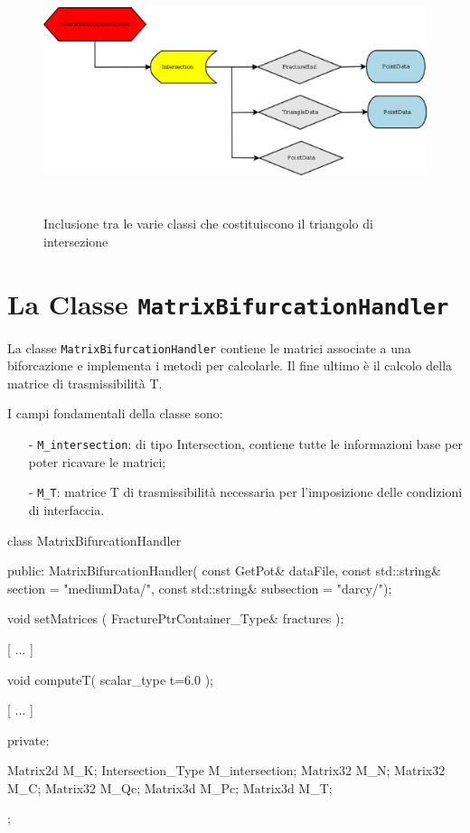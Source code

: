 \newpage
\begin{figure}[htbp]
\centering
\includegraphics[height=7cm, width=1\textwidth]{img/MatrixBifurcationHandler2.eps}
\caption{Inclusione tra le varie classi che costituiscono il triangolo di intersezione}\label{Inclusione classi MatrixBifurcationHandler}
\end{figure}

\section{La Classe \texttt{MatrixBifurcationHandler}}
La classe \texttt{MatrixBifurcationHandler} contiene le matrici associate a una biforcazione e implementa i metodi per calcolarle.  Il fine ultimo è il calcolo della matrice di trasmissibilità T.

\noindent I campi fondamentali della classe sono:
	\begin{enumerate}
	\item[-] \texttt{M\_intersection}: di tipo Intersection, contiene tutte le informazioni base per poter ricavare le matrici;
	\item[-] \texttt{M\_T}: matrice T di trasmissibilità necessaria per l'imposizione delle condizioni di interfaccia.
	\end{enumerate} 
\begin{Code03_03}[caption={Classe \texttt{Intersection}}]
class MatrixBifurcationHandler
{
 public:
	MatrixBifurcationHandler( const GetPot& dataFile,
				const std::string& section = "mediumData/",
				const std::string& subsection = "darcy/");
	
	void setMatrices ( FracturePtrContainer_Type& fractures );
	
	[ ... ]
	
	void computeT( scalar_type t=6.0 );

	[ ... ]

 private:

	Matrix2d M_K;
	Intersection_Type M_intersection;
	Matrix32 M_N;
	Matrix32 M_C;
	Matrix32 M_Qc;
	Matrix3d M_Pc;
	Matrix3d M_T;
};
\end{Code03_03}

